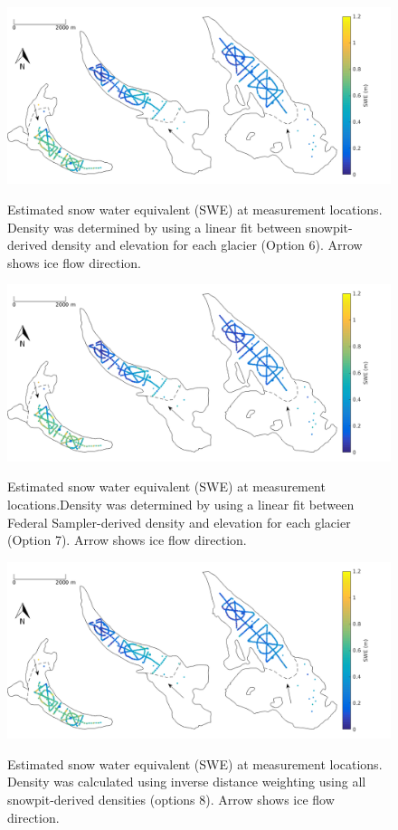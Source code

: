 \documentclass[12pt]{article}
\begin{document}
\begin{figure}[H]
	\centering
	\includegraphics[width = \textwidth]{SWEmap_opt6.png}\\
	\caption{Estimated snow water equivalent (SWE) at measurement locations. Density was determined by using a linear fit between snowpit-derived density and elevation for each glacier (Option 6). Arrow shows ice flow direction.}
\end{figure}

\begin{figure}[H]
	\centering
	\includegraphics[width = \textwidth]{SWEmap_opt7.png}\\
	\caption{Estimated snow water equivalent (SWE) at measurement locations.Density was determined by using a linear fit between Federal Sampler-derived density and elevation for each glacier (Option 7). Arrow shows ice flow direction.}
\end{figure}

\begin{figure}[H]
	\centering
	\includegraphics[width = \textwidth]{SWEmap_opt8.png}\\
	\caption{Estimated snow water equivalent (SWE) at measurement locations. Density was calculated using inverse distance weighting using all snowpit-derived densities (options 8). Arrow shows ice flow direction.}
\end{figure}
\end{document}
